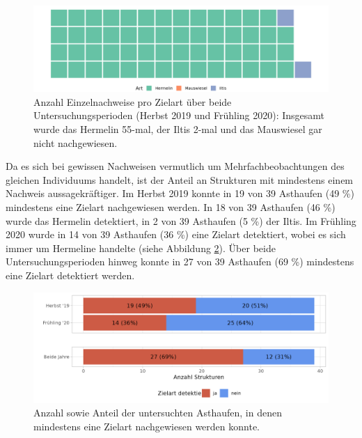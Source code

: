 \documentclass[
  oneside]{scrbook}
\begin{document}
\begin{figure}
\includegraphics[width=1\linewidth]{images/wirkungskontrolle_systematisch_einzelnachweise_waffle} \caption{Anzahl Einzelnachweise pro Zielart über beide Untersuchungsperioden (Herbst 2019 und Frühling 2020): Insgesamt wurde das Hermelin 55-mal, der Iltis 2-mal und das Mauswiesel gar nicht nachgewiesen.}\label{fig:wirkungskontrollesystematischeinzelnachweisewaffle}
\end{figure}

Da es sich bei gewissen Nachweisen vermutlich um Mehrfachbeobachtungen des gleichen Individuums handelt, ist der Anteil an Strukturen mit mindestens einem Nachweis aussagekräftiger. Im Herbst 2019 konnte in 19 von 39 Asthaufen (49 \%) mindestens eine Zielart nachgewiesen werden. In 18 von 39 Asthaufen (46 \%) wurde das Hermelin detektiert, in 2 von 39 Asthaufen (5 \%) der Iltis. Im Frühling 2020 wurde in 14 von 39 Asthaufen (36 \%) eine Zielart detektiert, wobei es sich immer um Hermeline handelte (siehe Abbildung \ref{fig:strukturenmitzielart}). Über beide Untersuchungsperioden hinweg konnte in 27 von 39 Asthaufen (69 \%) mindestens eine Zielart detektiert werden.



\begin{figure}
\includegraphics[width=1\linewidth]{images/strukturen_mit_zielart} \caption{Anzahl sowie Anteil der untersuchten Asthaufen, in denen mindestens eine Zielart nachgewiesen werden konnte.}\label{fig:strukturenmitzielart}
\end{figure}
\end{document}
